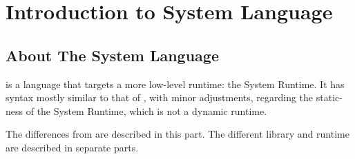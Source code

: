 
\chapter[Introduction to Amlantis\# System Language]{Introduction to \AmlSharpTitle System Language}

\minitoc

\newpage


\section[About The Amlantis\# System Language]{About The \AmlSharpTitle System Language}

\AmlSharpSystem is a language that targets a more low-level runtime: the System Runtime. It has syntax mostly similar to that of \Aml, with minor adjustments, regarding the static-ness of the System Runtime, which is not a dynamic runtime. 

The differences from \Aml are described in this part. The different library and runtime are described in separate parts. %







